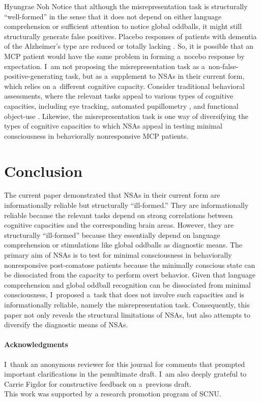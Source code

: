 \begin{artengenv}{Hyungrae Noh}
Notice that although the misrepresentation task is structurally ``well-formed'' in the sense that it does not depend on either language comprehension or sufficient attention to notice global oddballs, it might still structurally generate false positives. Placebo responses of patients with dementia of the Alzheimer's type are reduced or totally lacking
\parencite[][p.349]{benedetti_how_2011}. %
 So, it is possible that an MCP patient would have the same problem in forming a~nocebo response by expectation. I~am not proposing the misrepresentation task as a~non-false-positive-generating task, but as a~supplement to NSAs in their current form, which relies on a~different cognitive capacity. Consider traditional behavioral assessments, where the relevant tasks appeal to various types of cognitive capacities, including eye tracking, automated pupillometry 
\parencite[][]{vassilieva_automated_2019}, %
 and functional object-use 
\parencite[][]{sun_personalized_2018}. %
 Likewise, the misrepresentation task is one way of diversifying the types of cognitive capacities to which NSAs appeal in testing minimal consciousness in behaviorally nonresponsive MCP patients.

\section{Conclusion}
The current paper demonstrated that NSAs in their current form are informationally reliable but structurally ``ill-formed.'' They are informationally reliable because the relevant tasks depend on strong correlations between cognitive capacities and the corresponding brain areas. However, they are structurally ``ill-formed'' because they essentially depend on language comprehension or stimulations like global oddballs as diagnostic means. The primary aim of NSAs is to test for minimal consciousness in behaviorally nonresponsive post-comatose patients because the minimally conscious state can be dissociated from the capacity to perform overt behavior. Given that language comprehension and global oddball recognition can be dissociated from minimal consciousness, I~proposed a~task that does not involve such capacities and is informationally reliable, namely the misrepresentation task. Consequently, this paper not only reveals the structural limitations of NSAs, but also attempts to diversify the diagnostic means of NSAs.

\paragraph{Acknowledgments}
I~thank an anonymous reviewer for this journal for comments that prompted important clarifications in the penultimate draft. I~am also deeply grateful to Carrie Figdor for constructive feedback on a~previous draft.\\
This work was supported by a research promotion program of SCNU.


\end{artengenv}


